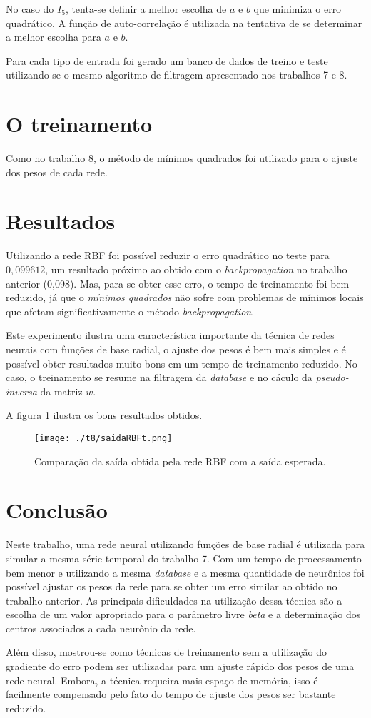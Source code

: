 \documentclass[10pt,journal,letterpaper,compsoc]{IEEEtran}
\begin{document}
No caso do $I_5$, tenta-se definir a melhor escolha de $a$ e $b$ que minimiza o erro quadrático.
A função de auto-correlação é utilizada na tentativa de se determinar a melhor escolha para $a$ e
$b$. 

Para cada tipo de entrada foi gerado um banco de dados de treino e teste utilizando-se o mesmo algoritmo
de filtragem apresentado nos trabalhos 7 e 8.

\section{O treinamento}

Como no trabalho 8, o método de mínimos quadrados foi utilizado para o ajuste dos pesos de cada rede.

\section{Resultados}

Utilizando a rede RBF foi possível reduzir o erro quadrático 
no teste para $0,099612$, um resultado próximo ao 
obtido com o {\it backpropagation} no trabalho anterior (0,098). Mas, para se 
obter esse erro, o tempo de treinamento
foi bem reduzido, já que o {\it mínimos quadrados} não sofre com problemas de mínimos locais que afetam
significativamente o método {\it backpropagation}.

Este experimento ilustra uma característica importante da técnica de redes neurais com funções de base radial,
o ajuste dos pesos é bem mais simples e é possível obter resultados muito bons em um tempo de treinamento 
reduzido.
No caso, o treinamento se resume na filtragem da {\it database} e no cáculo da {\it pseudo-inversa} da matriz $w$.

A figura \ref{erro.1} ilustra os bons resultados obtidos.

\begin{figure}[!htb]
     \centering
     \texttt{[image: ./t8/saidaRBFt.png]}
     \caption{Comparação da saída obtida pela rede RBF com a saída esperada.}
     \label{erro.1}
\end{figure}


\section{Conclusão}
Neste trabalho, uma rede neural utilizando funções de base radial é utilizada para simular a mesma série temporal
do trabalho 7. Com um tempo de processamento bem menor e utilizando a mesma {\it database} e a mesma quantidade 
de neurônios foi possível ajustar os pesos da rede para se obter um erro similar ao obtido no trabalho anterior.
As principais dificuldades na utilização dessa técnica são a escolha de um valor apropriado para o parâmetro livre
{\it beta} e a determinação dos centros associados a cada neurônio da rede.

Além disso, mostrou-se como técnicas de treinamento sem a utilização do gradiente do erro podem ser utilizadas
para um ajuste rápido dos pesos de uma rede neural. Embora, a técnica requeira mais espaço de memória, isso é
facilmente compensado pelo fato do tempo de ajuste dos pesos ser bastante reduzido.
\end{document}
